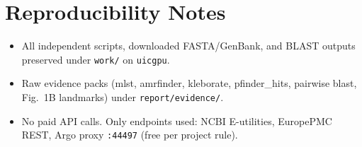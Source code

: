 \documentclass[11pt,letterpaper]{article}
\begin{document}
\section{Reproducibility Notes}
\begin{itemize}[leftmargin=1.5em]
  \item All independent scripts, downloaded FASTA/GenBank, and BLAST outputs preserved under
        \texttt{work/} on \texttt{uicgpu}.
  \item Raw evidence packs (mlst, amrfinder, kleborate, pfinder\_hits, pairwise blast, Fig.~1B
        landmarks) under \texttt{report/evidence/}.
  \item No paid API calls. Only endpoints used: NCBI E-utilities, EuropePMC REST, Argo proxy
        \texttt{:44497} (free per project rule).
\end{itemize}
\end{document}

